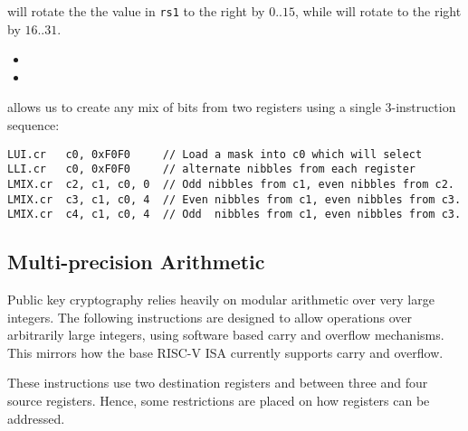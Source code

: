  will rotate the the value in {\tt rs1} to the right by $0..15$,
while  will rotate to the right by $16..31$. 

\begin{itemize}
\item {}
\item {}
\end{itemize}

 allows us to create any mix of bits from two registers
using a single 3-instruction sequence:

\begin{lstlisting}[style=float]
LUI.cr   c0, 0xF0F0     // Load a mask into c0 which will select
LLI.cr   c0, 0xF0F0     // alternate nibbles from each register
LMIX.cr  c2, c1, c0, 0  // Odd nibbles from c1, even nibbles from c2.
LMIX.cr  c3, c1, c0, 4  // Even nibbles from c1, even nibbles from c3.
LMIX.cr  c4, c1, c0, 4  // Odd  nibbles from c1, even nibbles from c3.
\end{lstlisting}


\subsection{Multi-precision Arithmetic}

Public key cryptography relies heavily on modular arithmetic over very
large integers. The following instructions are designed to allow
operations over arbitrarily large integers, using software based carry
and overflow mechanisms. This mirrors how the base RISC-V ISA currently
supports carry and overflow.

These instructions use two destination registers and between three
and four source registers. Hence, some restrictions are placed on how
registers can be addressed.

